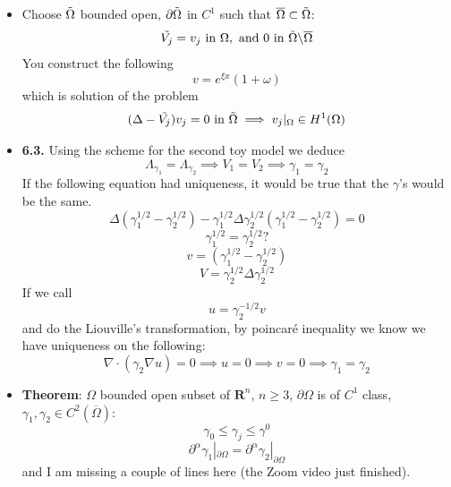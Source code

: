 \documentclass{article}
\begin{document}
\begin{itemize}
    \item Choose $\Tilde{\Omega}$ bounded open, $\partial \Tilde{\Omega}$ in $C^1$ such that $\overline{\Omega} \subset \Tilde{\Omega}$:
    \begin{equation}
        \Tilde{V_j} = v_j \ \text{in } \Omega, \text{ and } 0 \text{ in } \Tilde{\Omega}\backslash \overline{\Omega}
    \end{equation}
    You construct the following
    \begin{equation}
        v = e^{\xi x} (1 + \omega)
    \end{equation}
    which is solution of the problem
    \begin{equation}
        (\Delta - \Tilde{V_j})v_j = 0 \text{ in } \Tilde{\Omega } \implies v_j|_\Omega \in H^1(\Omega)
    \end{equation}

    \item \textbf{6.3.} Using the scheme for the second toy model we deduce
    \begin{equation}
        \Lambda_{\gamma_1} = \Lambda_{\gamma_2} \implies V_1 = V_2 \implies \gamma_1 = \gamma_2
    \end{equation}
    If the following equation had uniqueness, it would be true that the $\gamma$'s would be the same.
    \begin{equation}
        \Delta (\gamma_1^{1/2} - \gamma_2^{1/2}) - \gamma_1^{1/2} \Delta \gamma_2^{1/2}(\gamma_1^{1/2} - \gamma_2^{1/2}) = 0
    \end{equation}
    \begin{equation}
        \gamma_1^{1/2} = \gamma_2^{1/2}?
    \end{equation}
    \begin{equation}
        v = (\gamma_1^{1/2} - \gamma_2^{1/2})
    \end{equation}
    \begin{equation}
        V = \gamma_2^{1/2} \Delta \gamma_2^{1/2}
    \end{equation}
    If we call
    \begin{equation}
        u = \gamma_2^{-1/2} v
    \end{equation}
    and do the Liouville's transformation, by poincaré inequality we know we have uniqueness on the following:
    \begin{equation}
        \nabla \cdot (\gamma_2 \nabla u ) = 0 \implies u = 0 \implies v= 0 \implies \gamma_1 = \gamma_2
    \end{equation}

    \item \textbf{Theorem}: $\Omega$ bounded open subset of $\mathbf{R}^n$, $n\geq3$, $\partial \Omega$ is of $C^1$ class, $\gamma_1, \gamma_2 \in C^2(\overline{\Omega})$:
    \begin{equation}
        \gamma_0 \leq \gamma_j \leq \gamma^0
    \end{equation}
    \begin{equation}
        \partial^\alpha \gamma_1|_{\partial \Omega} = \partial^\alpha \gamma_2|_{\partial \Omega}
    \end{equation}
    and I am missing a couple of lines here (the Zoom video just finished).
\end{itemize}
\end{document}
